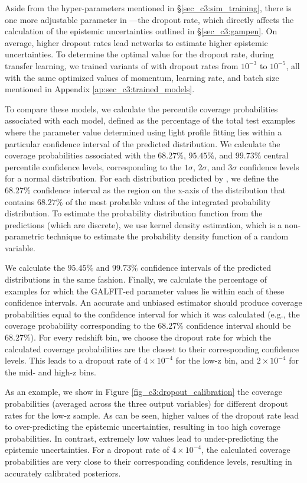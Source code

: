Aside from the hyper-parameters mentioned in \S \ref{sec_c3:sim_training}, there is one more adjustable parameter in \gampen{}---the dropout rate, which directly affects the calculation of the epistemic uncertainties outlined in \S \ref{sec_c3:gampen}. On average, higher dropout rates lead networks to estimate higher epistemic uncertainties. To determine the optimal value for the dropout rate, during transfer learning, we trained variants of \gampen{} with dropout rates from $10^{-3}$ to $10^{-5}$, all with the same optimized values of momentum, learning rate, and batch size mentioned in Appendix \ref{ap:sec_c3:trained_models}.

To compare these models, we calculate the percentile coverage probabilities associated with each model, defined as the percentage of the total test examples where the parameter value determined using light profile fitting lies within a particular confidence interval of the predicted distribution. We calculate the coverage probabilities associated with the $68.27\%$, $95.45\%$, and $99.73\%$ central percentile confidence levels, corresponding to the $1\sigma$, $2\sigma$, and $3\sigma$ confidence levels for a normal distribution. For each distribution predicted by \gampen{}, we define the $68.27\%$ confidence interval as the region on the x-axis of the distribution that contains $68.27\%$ of the most probable values of the integrated probability distribution. To estimate the probability distribution function from the \gampen{} predictions (which are discrete), we use kernel density estimation, which is a non-parametric technique to estimate the probability density function of a random variable. 

We calculate the $95.45\%$ and $99.73\%$ confidence intervals of the predicted distributions in the same fashion. Finally, we calculate the percentage of examples for which the GALFIT-ed parameter values lie within each of these confidence intervals. An accurate and unbiased estimator should produce coverage probabilities equal to the confidence interval for which it was calculated (e.g., the coverage probability corresponding to the $68.27\%$ confidence interval should be $68.27\%$). For every redshift bin, we choose the dropout rate for which the calculated coverage probabilities are the closest to their corresponding confidence levels. This leads to a dropout rate of $4\times10^{-4}$ for the low-z bin, and $2\times10^{-4}$ for the mid- and high-z bins. 

As an example, we show in Figure \ref{fig_c3:dropout_calibration} the coverage probabilities (averaged across the three output variables) for different dropout rates for the low-z sample. As can be seen, higher values of the dropout rate lead to \gampen{} over-predicting the epistemic uncertainties, resulting in too high coverage probabilities. In contrast, extremely low values lead to \gampen{} under-predicting the epistemic uncertainties. For a dropout rate of $4\times10^{-4}$, the calculated coverage probabilities are very close to their corresponding confidence levels, resulting in accurately calibrated posteriors. 


